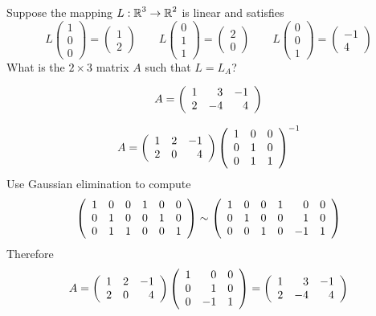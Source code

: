 \documentclass{ximera}
\author{Matthew Carr}
\begin{document}

\begin{exercise}\label{mc.exercise11}
Suppose the mapping $L:\mbox{$\Bbb{R}$}^3\to\mbox{$\Bbb{R}$}^2$ is linear and satisfies
\[
L \left(\begin{array}{c} 1 \\ 0 \\0 \end{array}\right) = \left(\begin{array}{c} 1 \\ 2  \end{array}\right) \qquad
L \left(\begin{array}{c} 0 \\ 1\\ 1 \end{array}\right) = \left(\begin{array}{c} 2 \\ 0 \end{array}\right) \qquad
L\left(\begin{array}{c} 0 \\ 0 \\ 1 \end{array}\right) = \left(\begin{array}{r} -1 \\ 4 \end{array}\right)
\]
What is the  $2\times 3$ matrix $A$ such that $L = L_A$?

  
\begin{solution}

\ans \[
A = \left(\begin{array}{rrrrrrrrrrrrrrrrrr} 1 & 3 & -1\\ 2 & -4 & 4 \end{array}\right)
\]


\soln 
\[
A = \left(\begin{array}{rrrrrrrrrrrrrrrrrr} 1 & 2 & -1\\ 2 & 0 & 4 \end{array}\right) \left(\begin{array}{rrrrrrrrrrrrrrrrrr} 1 & 0 & 0 \\ 0 & 1 & 0 \\ 0 & 1 & 1 \end{array}\right)^{-1}
\]
Use Gaussian elimination to compute 
\[
\left(\begin{array}{rrrrrrrrrrrrrrrrrr} 1 & 0 & 0 & 1 & 0 & 0\\ 0 & 1 & 0 & 0 & 1 & 0\\ 0 & 1 & 1 & 0 & 0 & 1 \end{array}\right)\sim
\left(\begin{array}{rrrrrrrrrrrrrrrrrr} 1 & 0 & 0 & 1 & 0 & 0\\ 0 & 1 & 0 & 0 & 1 & 0\\ 0 & 0 & 1 & 0 & -1 & 1 \end{array}\right)
\]
Therefore
\[
A = \left(\begin{array}{rrrrrrrrrrrrrrrrrr} 1 & 2 & -1\\ 2 & 0 & 4 \end{array}\right) \left(\begin{array}{rrrrrrrrrrrrrrrrrr}  1 & 0 & 0\\   0 & 1 & 0\\  0 & -1 & 1 \end{array}\right) = 
 \left(\begin{array}{rrrrrrrrrrrrrrrrrr} 1 & 3 & -1\\ 2 & -4 & 4 \end{array}\right) 
\]

\end{solution}
\end{exercise}
\end{document}
